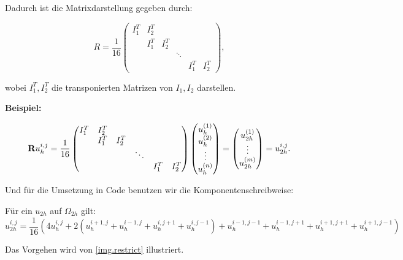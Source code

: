Dadurch ist die Matrixdarstellung gegeben durch:

\begin{equation}
R = \frac{1}{16}
\begin{pmatrix}
I_{1}^{T} & I_{2}^{T}\\
		  & I_{1}^{T} & I_{2}^{T}\\
		  &			  &			  & \ddots\\
		  &			  &			  &		   & I_{1}^{T} & I_{2}^{T}
\end{pmatrix},
\end{equation}

wobei $I_{1}^{T}, I_{2}^{T}$ die transponierten Matrizen von $I_{1}, I_{2}$ darstellen.

\textbf{Beispiel:}

\begin{equation}
{\textbf{R}}u^{i,j}_{h} = \frac {1} {16}
\begin{pmatrix}
I_{1}^{T} & I_{2}^{T}\\
		  & I_{1}^{T} & I_{2}^{T}\\
		  &			  &			  & \ddots\\
		  &			  &			  &		   & I_{1}^{T} & I_{2}^{T}
\end{pmatrix}
\begin{pmatrix}
u_{h}^{(1)} \\
u_{h}^{(2)} \\
\vdots \\
u_{h}^{(n)}
\end{pmatrix} =
\begin{pmatrix}
u_{2h}^{(1)} \\
\vdots \\
u_{2h}^{(m)}
\end{pmatrix} =
u^{i,j}_{2h}.
\end{equation}

Und für die Umsetzung in Code benutzen wir die Komponentenschreibweise:

Für ein $u_{2h}$ auf $\Omega_{2h}$ gilt:
\begin{equation}
u_{2h}^{i,j} = \frac {1} {16} (4u_{h}^{i,j}+2(u_{h}^{i+1,j}+u_{h}^{i-1,j}+u_{h}^{i,j+1}+u_{h}^{i,j-1})+u_{h}^{i-1,j-1}+u_{h}^{i-1,j+1}+u_{h}^{i+1,j+1}+u_{h}^{i+1,j-1})
\end{equation}

Das Vorgehen wird von \autoref{img.restrict} illustriert.

\label{img.restrict}

